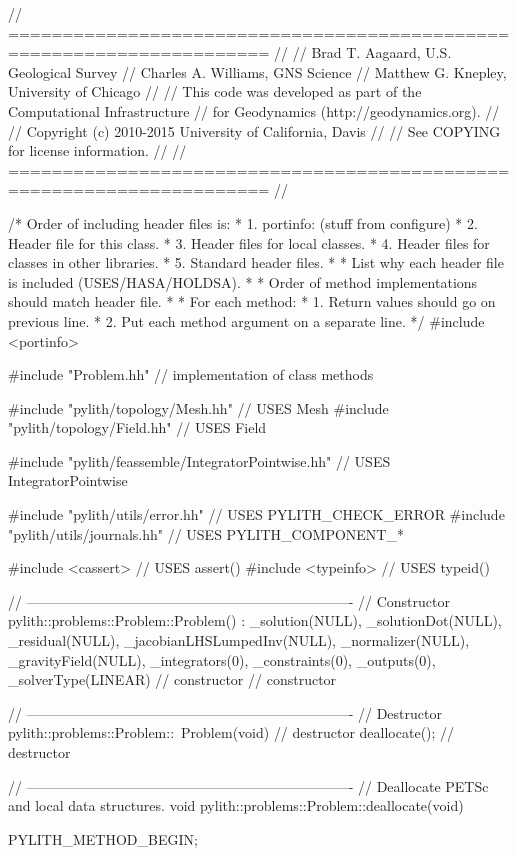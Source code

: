 \begin{cplusplus}
// ======================================================================
//
// Brad T. Aagaard, U.S. Geological Survey
// Charles A. Williams, GNS Science
// Matthew G. Knepley, University of Chicago
//
// This code was developed as part of the Computational Infrastructure
// for Geodynamics (http://geodynamics.org).
//
// Copyright (c) 2010-2015 University of California, Davis
//
// See COPYING for license information.
//
// ======================================================================
//

/* Order of including header files is:
 * 1. portinfo: (stuff from configure)
 * 2. Header file for this class.
 * 3. Header files for local classes.
 * 4. Header files for classes in other libraries.
 * 5. Standard header files.
 *
 * List why each header file is included (USES/HASA/HOLDSA).
 *
 * Order of method implementations should match header file.
 *
 * For each method:
 *   1. Return values should go on previous line.
 *   2. Put each method argument on a separate line.
 */
#include <portinfo>

#include "Problem.hh" // implementation of class methods

#include "pylith/topology/Mesh.hh" // USES Mesh
#include "pylith/topology/Field.hh" // USES Field

#include "pylith/feassemble/IntegratorPointwise.hh" // USES IntegratorPointwise

#include "pylith/utils/error.hh" // USES PYLITH_CHECK_ERROR
#include "pylith/utils/journals.hh" // USES PYLITH_COMPONENT_*

#include <cassert> // USES assert()
#include <typeinfo> // USES typeid()

// ----------------------------------------------------------------------
// Constructor
pylith::problems::Problem::Problem() :
    _solution(NULL),
    _solutionDot(NULL),
    _residual(NULL),
    _jacobianLHSLumpedInv(NULL),
    _normalizer(NULL),
    _gravityField(NULL),
    _integrators(0),
    _constraints(0),
    _outputs(0),
    _solverType(LINEAR)
{ // constructor
} // constructor

// ----------------------------------------------------------------------
// Destructor
pylith::problems::Problem::~Problem(void)
{ // destructor
    deallocate();
} // destructor

// ----------------------------------------------------------------------
// Deallocate PETSc and local data structures.
void
pylith::problems::Problem::deallocate(void) {
    PYLITH_METHOD_BEGIN;

}
\end{cplusplus}
